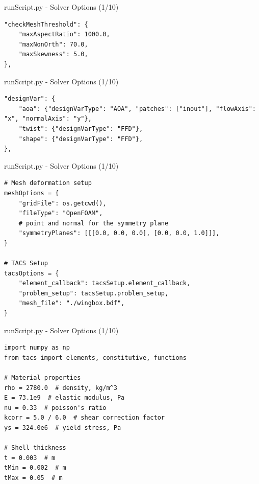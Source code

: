 \documentclass{bredelebeamer}
\begin{document}
\begin{frame}[fragile]{runScript.py - Solver Options (1/10)}
\scriptsize
\lstset{ language=bash }
\begin{lstlisting}
"checkMeshThreshold": {
    "maxAspectRatio": 1000.0,
    "maxNonOrth": 70.0,
    "maxSkewness": 5.0,
},
\end{lstlisting}
\normalsize
\end{frame}

\begin{frame}[fragile]{runScript.py - Solver Options (1/10)}
\scriptsize
\lstset{ language=bash }
\begin{lstlisting}
"designVar": {
    "aoa": {"designVarType": "AOA", "patches": ["inout"], "flowAxis": "x", "normalAxis": "y"},
    "twist": {"designVarType": "FFD"},
    "shape": {"designVarType": "FFD"},
},
\end{lstlisting}
\normalsize
\end{frame}

\begin{frame}[fragile]{runScript.py - Solver Options (1/10)}
\scriptsize
\lstset{ language=bash }
\begin{lstlisting}
# Mesh deformation setup
meshOptions = {
    "gridFile": os.getcwd(),
    "fileType": "OpenFOAM",
    # point and normal for the symmetry plane
    "symmetryPlanes": [[[0.0, 0.0, 0.0], [0.0, 0.0, 1.0]]],
}

# TACS Setup
tacsOptions = {
    "element_callback": tacsSetup.element_callback,
    "problem_setup": tacsSetup.problem_setup,
    "mesh_file": "./wingbox.bdf",
}
\end{lstlisting}
\normalsize
\end{frame}

\begin{frame}[fragile]{runScript.py - Solver Options (1/10)}
\scriptsize
\lstset{ language=bash }
\begin{lstlisting}
import numpy as np
from tacs import elements, constitutive, functions

# Material properties
rho = 2780.0  # density, kg/m^3
E = 73.1e9  # elastic modulus, Pa
nu = 0.33  # poisson's ratio
kcorr = 5.0 / 6.0  # shear correction factor
ys = 324.0e6  # yield stress, Pa

# Shell thickness
t = 0.003  # m
tMin = 0.002  # m
tMax = 0.05  # m
\end{lstlisting}
\normalsize
\end{frame}
\end{document}
